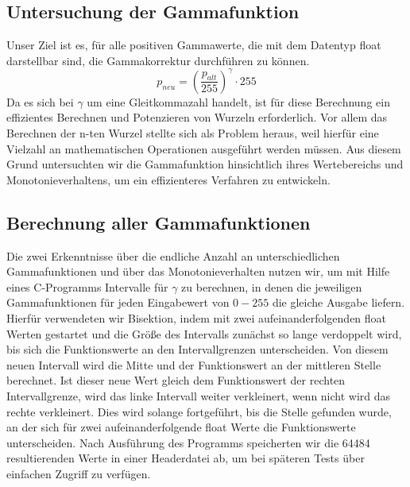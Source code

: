 \documentclass[course=erap]{aspdoc}
\begin{document}
	
	\subsection{Untersuchung der Gammafunktion}
	Unser Ziel ist es, für alle positiven Gammawerte, die mit dem Datentyp float darstellbar sind, die Gammakorrektur durchführen zu können.
	\begin{equation}
	p_{neu} = \left(\frac{p_{alt}}{255}\right)^{\gamma} \cdot 255
	\end{equation}   
	Da es sich bei $\gamma$ um eine Gleitkommazahl handelt, ist für diese Berechnung ein effizientes Berechnen und Potenzieren von Wurzeln erforderlich. Vor allem das Berechnen der n-ten Wurzel stellte sich als Problem heraus, weil hierfür eine Vielzahl an mathematischen Operationen ausgeführt werden müssen. Aus diesem Grund untersuchten wir die Gammafunktion hinsichtlich ihres Wertebereichs und Monotonieverhaltens, um ein effizienteres Verfahren zu entwickeln.
	\newline
	
	\subsection{Berechnung aller Gammafunktionen}
	Die zwei Erkenntnisse über die endliche Anzahl an unterschiedlichen Gammafunktionen und über das Monotonieverhalten nutzen wir, um mit Hilfe eines C-Programms Intervalle für $\gamma$ zu berechnen, in denen die jeweiligen Gammafunktionen für jeden Eingabewert von $0-255$ die gleiche Ausgabe liefern. Hierfür verwendeten wir Bisektion, indem mit zwei aufeinanderfolgenden float Werten gestartet und die Größe des Intervalls zunächst so lange verdoppelt wird, bis sich die Funktionswerte an den Intervallgrenzen unterscheiden. Von diesem neuen Intervall wird die Mitte und der Funktionswert an der mittleren Stelle berechnet. Ist dieser neue Wert gleich dem Funktionswert der rechten Intervallgrenze, wird das linke Intervall weiter verkleinert, wenn nicht wird das rechte verkleinert. Dies wird solange fortgeführt, bis die Stelle gefunden wurde, an der sich für zwei aufeinanderfolgende float Werte die Funktionswerte unterscheiden. Nach Ausführung des Programms speicherten wir die 64484 resultierenden Werte in einer Headerdatei ab, um bei späteren Tests über einfachen Zugriff zu verfügen.
	
\end{document}
